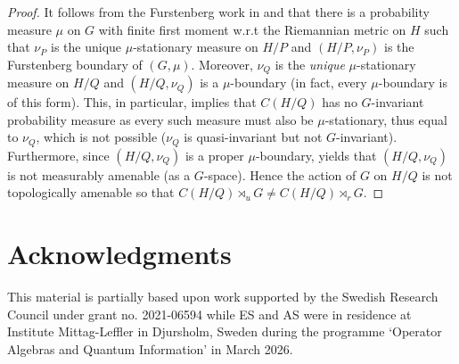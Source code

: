 \documentclass[12pt]{amsart}
\theoremstyle{definition}
\theoremstyle{remark}
\numberwithin{equation}{section}
\begin{document}
\begin{proof}
	It follows from the Furstenberg work in \cite{Fur67} and \cite{Fur71} that there is a probability measure $\mu$ on $G$ with finite first moment w.r.t the Riemannian metric on $H$ such that $\nu_P$ is the unique $\mu$-stationary measure on $H/P$ and $(H/P,\nu_P)$ is the Furstenberg boundary of $(G,\mu)$. Moreover, $\nu_Q$ is the \emph{unique} $\mu$-stationary measure on $H/Q$ and $(H/Q,\nu_Q)$ is a $\mu$-boundary (in fact, every $\mu$-boundary is of this form). This, in particular, implies that $C(H/Q)$ has no $G$-invariant probability measure as every such measure must also be $\mu$-stationary, thus equal to $\nu_Q$, which is not possible ($\nu_Q$ is quasi-invariant but not $G$-invariant). Furthermore, since $(H/Q,\nu_Q)$ is a proper $\mu$-boundary, %
    \cite[Theorem 9.2]{nevosageev} yields that $(H/Q,\nu_Q)$ is not measurably amenable (as a $G$-space). Hence the action of $G$ on $H/Q$ is not topologically amenable so that  $C(H/Q)\rtimes_u G\neq C(H/Q)\rtimes_r G$.
	
\end{proof}







\section*{Acknowledgments}
This material is partially based upon work supported by the Swedish Research Council under grant no. 2021-06594 while ES and AS  were in residence at Institute Mittag-Leffler in Djursholm, Sweden during the programme `Operator Algebras and Quantum Information' in March 2026.
\end{document}

